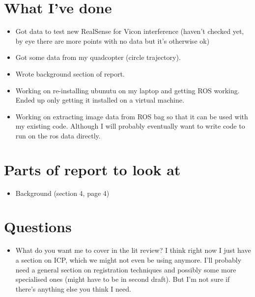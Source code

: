 \documentclass[12pt,a4paper]{article}
\begin{document}
\author{Katrina Ashton}


\pagestyle{fancy}
\fancyhf{}
\rhead{\thepage}

\section{What I've done}
\begin{itemize}
\item Got data to test new RealSense for Vicon interference (haven't checked yet, by eye there are more points with no data but it's otherwise ok)
\item Got some data from my quadcopter (circle trajectory).
\item Wrote background section of report.
\item Working on re-installing ubunutu on my laptop and getting ROS working. Ended up only getting it installed on a virtual machine.
\item Working on extracting image data from ROS bag so that it can be used with my existing code. Although I will probably eventually want to write code to run on the ros data directly.
\end{itemize}

\section{Parts of report to look at}
\begin{itemize}
\item Background (section 4, page 4)
\end{itemize}

\section{Questions}
\begin{itemize}
\item What do you want me to cover in the lit review? I think right now I just have a section on ICP, which we might not even be using anymore. I'll probably need a general section on registration techniques and possibly some more specialised ones (might have to be in second draft). But I'm not sure if there's anything else you think I need.
\end{itemize}
\end{document}
